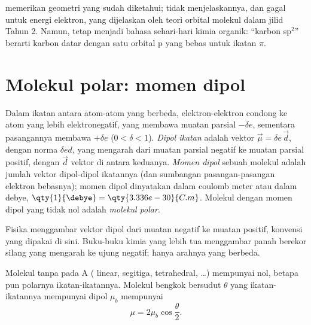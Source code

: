 \begin{remark}\label{rem:b1:lewis-resonance-vsepr:hybrid-limit}
 memerikan geometri yang sudah diketahui;  tidak
menjelaskannya, dan gagal untuk energi elektron, yang dijelaskan oleh
teori orbital molekul dalam jilid Tahun 2. Namun,  tetap
menjadi bahasa sehari-hari kimia organik: ``karbon sp$^2$'' berarti
karbon datar dengan satu orbital p yang bebas untuk ikatan $\pi$.
\end{remark}

\section{Molekul polar: momen dipol}

\begin{definition}\label{def:b1:lewis-resonance-vsepr:dipole}
Dalam ikatan antara atom-atom yang  berbeda,
elektron-elektron condong ke atom yang lebih elektronegatif, yang membawa
muatan parsial $-\delta e$, sementara pasangannya membawa $+\delta e$
($0 < \delta < 1$). \emph{Dipol ikatan} adalah vektor
$\vec\mu = \delta e\,
\vec d$, dengan norma $\delta e d$, yang mengarah
dari muatan parsial negatif ke muatan parsial positif, dengan $\vec d$
vektor di antara keduanya. \emph{Momen dipol} sebuah
molekul adalah jumlah vektor dipol-dipol ikatannya (dan sumbangan
pasangan-pasangan elektron bebasnya); momen dipol dinyatakan dalam
coulomb meter atau dalam debye, $\qty{1}{\debye} =
\qty{3.336e-30}{C.m}$. Molekul dengan momen dipol yang tidak nol adalah
\emph{molekul polar}.
\end{definition}

\begin{remark}\label{rem:b1:lewis-resonance-vsepr:convention}
Fisika menggambar vektor dipol dari muatan negatif ke muatan positif,
konvensi yang dipakai di sini. Buku-buku kimia yang lebih tua menggambar
panah berekor silang yang mengarah ke ujung negatif; hanya arahnya yang
berbeda.
\end{remark}

\begin{proposition}\label{prop:b1:lewis-resonance-vsepr:dipole-sum}
Molekul  tanpa  pada A ( linear,
 segitiga,  tetrahedral, \dots) mempunyai 
nol, betapa pun polarnya ikatan-ikatannya. Molekul  bengkok
bersudut $\theta$ yang ikatan-ikatannya mempunyai dipol $\mu_b$ mempunyai
\[
  \mu = 2\mu_b \cos\frac{\theta}{2} .
\]
\end{proposition}

